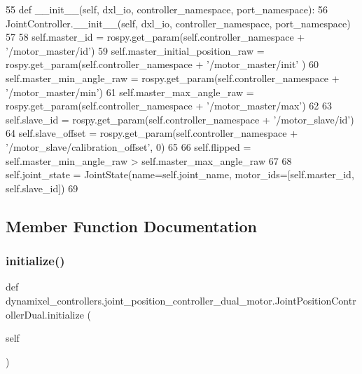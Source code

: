 \begin{DoxyCode}
55     \textcolor{keyword}{def }\_\_init\_\_(self, dxl\_io, controller\_namespace, port\_namespace):
56         JointController.\_\_init\_\_(self, dxl\_io, controller\_namespace, port\_namespace)
57         
58         self.master\_id = rospy.get\_param(self.controller\_namespace + \textcolor{stringliteral}{'/motor\_master/id'})
59         self.master\_initial\_position\_raw = rospy.get\_param(self.controller\_namespace + \textcolor{stringliteral}{'/motor\_master/init'}
      )
60         self.master\_min\_angle\_raw = rospy.get\_param(self.controller\_namespace + \textcolor{stringliteral}{'/motor\_master/min'})
61         self.master\_max\_angle\_raw = rospy.get\_param(self.controller\_namespace + \textcolor{stringliteral}{'/motor\_master/max'})
62         
63         self.slave\_id = rospy.get\_param(self.controller\_namespace + \textcolor{stringliteral}{'/motor\_slave/id'})
64         self.slave\_offset = rospy.get\_param(self.controller\_namespace + \textcolor{stringliteral}{'/motor\_slave/calibration\_offset'}, 
      0)
65         
66         self.flipped = self.master\_min\_angle\_raw > self.master\_max\_angle\_raw
67         
68         self.joint\_state = JointState(name=self.joint\_name, motor\_ids=[self.master\_id, self.slave\_id])
69 
\end{DoxyCode}


\subsection{Member Function Documentation}
\mbox{\label{classdynamixel__controllers_1_1joint__position__controller__dual__motor_1_1_joint_position_controller_dual_a87a789b223b9a34aec5a1538ee24d16a}} 
\subsubsection{\texorpdfstring{initialize()}{initialize()}}
{\footnotesize\ttfamily def dynamixel\+\_\+controllers.\+joint\+\_\+position\+\_\+controller\+\_\+dual\+\_\+motor.\+Joint\+Position\+Controller\+Dual.\+initialize (\begin{DoxyParamCaption}\item[{}]{self }\end{DoxyParamCaption})}



